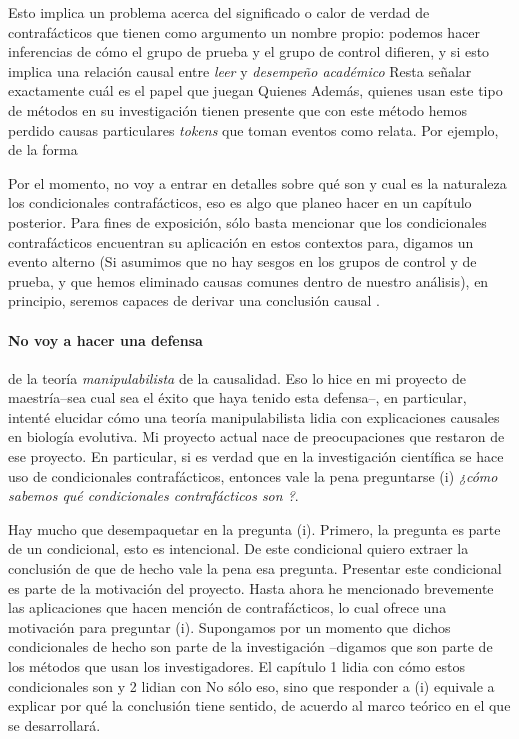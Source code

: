 Esto implica un problema acerca del significado o calor de verdad de contrafácticos que tienen como argumento un nombre propio: podemos hacer inferencias de cómo el grupo de prueba y el grupo de control difieren, y si esto implica una relación causal entre \emph{leer} y \emph{desempeño académico}
Resta señalar exactamente cuál es el papel que juegan  Quienes  Además, quienes usan este tipo de métodos en su investigación tienen presente que con este método hemos perdido causas particulares \emph{tokens} que toman eventos como relata. Por ejemplo,  de la forma

Por el momento, no voy a entrar en detalles sobre qué son y cual es la naturaleza los condicionales contrafácticos, eso es algo que planeo hacer en un capítulo posterior. Para fines de exposición, sólo basta mencionar que los condicionales contrafácticos encuentran su aplicación en estos contextos para, digamos  un evento alterno (Si asumimos que no hay sesgos en los grupos de control y de prueba, y que hemos eliminado causas comunes dentro de nuestro análisis), en principio, seremos capaces de derivar una conclusión causal \cite{Pearl2016, Otsuka2023}.

\paragraph{No voy a hacer una defensa} de la teoría
\emph{manipulabilista} de la causalidad. Eso lo hice en mi proyecto
de maestría--sea cual sea el éxito que haya tenido esta defensa--,
en particular, intenté elucidar cómo una teoría manipulabilista
lidia con explicaciones causales en biología evolutiva. Mi
proyecto actual nace de preocupaciones que restaron de ese proyecto.
En particular, si es verdad que en la investigación científica se
hace uso de condicionales contrafácticos, entonces vale la pena
preguntarse (i) \emph{¿cómo sabemos qué condicionales contrafácticos son ?}.

Hay mucho que desempaquetar en la pregunta (i). Primero, la
pregunta es parte de un condicional, esto es intencional. De este
condicional quiero extraer la conclusión de que de hecho vale la
pena esa pregunta. Presentar este condicional es parte de la motivación del proyecto. Hasta ahora he mencionado brevemente las aplicaciones que hacen mención de contrafácticos, lo cual ofrece una motivación para preguntar (i). Supongamos por un momento que dichos condicionales de hecho son parte de la investigación --digamos que son parte de los métodos que usan los investigadores. El capítulo 1 lidia con cómo estos condicionales son  y 2 lidian con   No sólo eso, sino que responder a (i) equivale a explicar por qué la conclusión tiene sentido, de acuerdo al marco teórico en el que se desarrollará.

